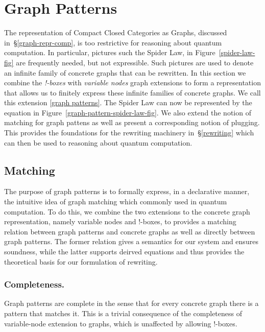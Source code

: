 \documentclass[runningheads]{llncs}
\begin{document}
\section{Graph Patterns}
\label{sec:patterns}

The representation of Compact Closed Categories as Graphs, discussed
in~\S\ref{graph-repr-comp}, is too restrictive for reasoning about
quantum computation. In particular, pictures such the Spider Law, in
Figure~\ref{spider-law-fig} are frequently needed, but not
expressible. Such pictures are used to denote an infinite family of
concrete graphs that can be rewritten. In this section we combine the
{\em !-boxes} with {\em variable nodes} graph extensions to form a
representation that allows us to finitely express these infinite
families of concrete graphs. We call this extension \ref{graph
  patterns}. The Spider Law can now be represented by the equation in
Figure~\ref{graph-pattern-spider-law-fig}. We also extend the notion
of matching for graph pattens as well as present a corresponding
notion of plugging. This provides the foundations for the rewriting
machinery in~\S\ref{rewriting} which can then be used to reasoning
about quantum computation.

\subsection{Matching}

The purpose of graph patterns is to formally express, in a declarative
manner, the intuitive idea of graph matching which commonly used in
quantum computation. To do this, we combine the two extensions to the
concrete graph representation, namely variable nodes and !-boxes, to
provides a matching relation between graph patterns and concrete
graphs as well as directly between graph patterns. The former relation
gives a semantics for our system and ensures soundness, while the
latter supports deirved equations and thus provides the theoretical
basis for our formulation of rewriting.

\subsubsection{Completeness.}

Graph patterns are complete in the sense that for every concrete graph
there is a pattern that matches it. This is a trivial consequence of
the completeness of variable-node extension to graphs, which is
unaffected by allowing !-boxes.
\end{document}
